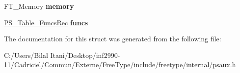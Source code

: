 \begin{DoxyCompactItemize}
\item 
F\+T\+\_\+\+Memory {\bfseries memory}\hypertarget{struct_p_s___table_rec___a061872add9c6d1af67cfdfac5ce2b80d}{}\label{struct_p_s___table_rec___a061872add9c6d1af67cfdfac5ce2b80d}

\item 
\hyperlink{struct_p_s___table___funcs_rec__}{P\+S\+\_\+\+Table\+\_\+\+Funcs\+Rec} {\bfseries funcs}\hypertarget{struct_p_s___table_rec___adced5ad36107c90012e9fafa55eab5b9}{}\label{struct_p_s___table_rec___adced5ad36107c90012e9fafa55eab5b9}

\end{DoxyCompactItemize}


The documentation for this struct was generated from the following file\+:\begin{DoxyCompactItemize}
\item 
C\+:/\+Users/\+Bilal Itani/\+Desktop/inf2990-\/11/\+Cadriciel/\+Commun/\+Externe/\+Free\+Type/include/freetype/internal/psaux.\+h\end{DoxyCompactItemize}
